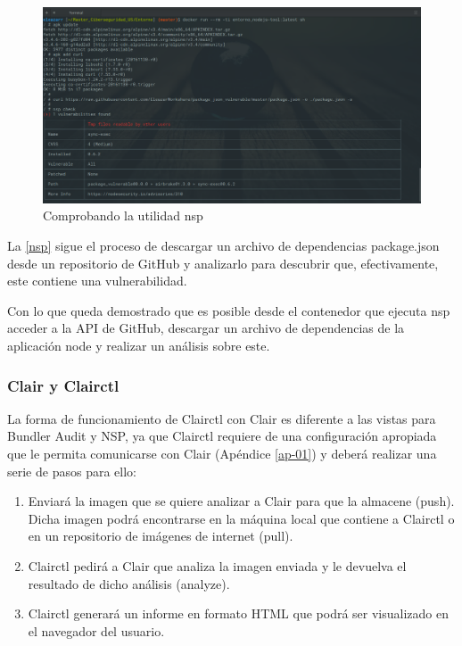 \begin{figure}[htbp]
	\centering
	\includegraphics[width=1.0\linewidth]
	{desarrollo/figuras/nsp.png}
	\caption{Comprobando la utilidad nsp}
	\label{nsp}
\end{figure}

La \autoref{nsp} sigue el proceso de descargar un archivo de dependencias package.json desde un repositorio de GitHub y analizarlo para descubrir que, efectivamente, este contiene una vulnerabilidad.

Con lo que queda demostrado que es posible desde el contenedor que ejecuta nsp acceder a la \gls{API} de GitHub, descargar un archivo de dependencias de la aplicación node y realizar un análisis sobre este.

\subsubsection{Clair y Clairctl}

La forma de funcionamiento de Clairctl con Clair es diferente a las vistas para Bundler Audit y NSP, ya que Clairctl requiere de una configuración apropiada que le permita comunicarse con Clair (Apéndice \autoref{ap-01}) y deberá realizar una serie de pasos para ello:

\begin{enumerate}
	\item Enviará la imagen que se quiere analizar a Clair para que la almacene (push). Dicha imagen podrá encontrarse en la máquina local que contiene a Clairctl o en un repositorio de imágenes de internet (pull).
	\item Clairctl pedirá a Clair que analiza la imagen enviada y le devuelva el resultado de dicho análisis (analyze).
	\item Clairctl generará un informe en formato HTML que podrá ser visualizado en el navegador del usuario.
\end{enumerate}

